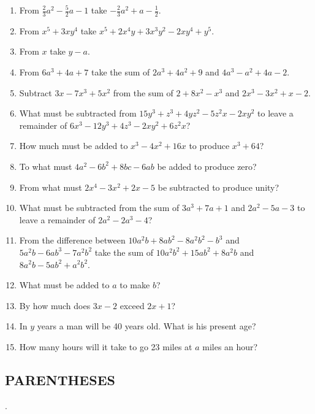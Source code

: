 \documentclass{book}
\begin{document}
\begin{enumerate}
\item From $\frac{2}{3}a^{2} - \frac{5}{2}a - 1$ take
$-\frac{2}{3}a^{2} + a -\frac{1}{2}$.

\item From $x^{5} + 3xy^{4}$ take $x^{5} + 2x^{4}y + 3x^{3}y^{2} -
2xy^{4} + y^{5}$.

\item From $x$ take $y - a$.

\item From $6a^3 + 4a + 7$ take the sum of $2a^3 + 4a^2 + 9$ and
$4a^3 - a^2 + 4a - 2$.

\item Subtract $3x - 7x^3 + 5x^2$ from the sum of $2 + 8x^2 - x^3$
and $2x^3 - 3x^2 + x - 2$.

\item What must be subtracted from $15y^3 + z^3 + 4yz^2 - 5z^2x -
2xy^2$ to leave a remainder of $6x^3 - 12y^3 + 4z^3 - 2xy^2 +
6z^2x$?

\item How much must be added to $x^3 - 4x^2 + 16x$ to produce $x^3
+ 64$?

\item To what must $4a^2 - 6b^2 + 8bc - 6ab$ be added to produce
zero?

\item From what must $2x^4 - 3x^2 + 2x - 5$ be subtracted to
produce unity?

\item What must be subtracted from the sum of $3a^3 + 7a + 1$ and
$2a^2 - 5a - 3$ to leave a remainder of $2a^2 - 2a^3 - 4$?

\item From the difference between $10a^2b + 8ab^2 - 8a^2b^2 - b^3$
and $5a^2b - 6ab^3 - 7a^2b^2$ take the sum of $10a^2b^2 + 15ab^2 +
8a^2b$ and $8a^2b - 5ab^2 + a^2b^2$.

\item What must be added to $a$ to make $b$?

\item By how much does $3x - 2$ exceed $2x + 1$?

\item In $y$ years a man will be 40 years old. What is his present
age?

\item How many hours will it take to go 23 miles at $a$ miles an
hour?
\end{enumerate}

\subsection*{PARENTHESES}.
\end{document}
